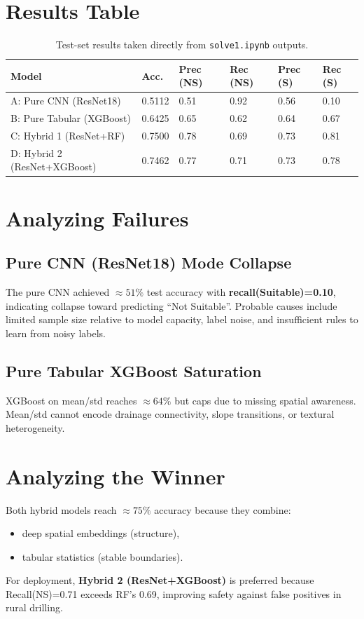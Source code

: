\documentclass[12pt,a4paper]{report}
\begin{document}
\section{Results Table}
\begin{table}[H]
\centering
\small
\begin{tabular}{p{} p{} p{} p{} p{} p{}}
\toprule
\textbf{Model} & \textbf{Acc.} &
\textbf{Prec (NS)} & \textbf{Rec (NS)} &
\textbf{Prec (S)} & \textbf{Rec (S)} \\
\midrule
A: Pure CNN (ResNet18) & 0.5112 & 0.51 & 0.92 & 0.56 & 0.10 \\
B: Pure Tabular (XGBoost) & 0.6425 & 0.65 & 0.62 & 0.64 & 0.67 \\
C: Hybrid 1 (ResNet+RF) & 0.7500 & 0.78 & 0.69 & 0.73 & 0.81 \\
D: Hybrid 2 (ResNet+XGBoost) & 0.7462 & 0.77 & 0.71 & 0.73 & 0.78 \\
\bottomrule
\end{tabular}
\caption{Test-set results taken directly from \texttt{solve1.ipynb} outputs.}
\label{tab:model2_results}
\end{table}

\section{Analyzing Failures}
\subsection{Pure CNN (ResNet18) Mode Collapse}
The pure CNN achieved \(\approx 51\%\) test accuracy with \textbf{recall(Suitable)=0.10}, indicating collapse toward predicting ``Not Suitable''. Probable causes include limited sample size relative to model capacity, label noise, and insufficient rules to learn from noisy labels.

\subsection{Pure Tabular XGBoost Saturation}
XGBoost on mean/std reaches \(\approx 64\%\) but caps due to missing spatial awareness. Mean/std cannot encode drainage connectivity, slope transitions, or textural heterogeneity.

\section{Analyzing the Winner}
Both hybrid models reach \(\approx 75\%\) accuracy because they combine:
\begin{itemize}
  \item deep spatial embeddings (structure),
  \item tabular statistics (stable boundaries).
\end{itemize}
For deployment, \textbf{Hybrid 2 (ResNet+XGBoost)} is preferred because Recall(NS)=0.71 exceeds RF’s 0.69, improving safety against false positives in rural drilling.
\end{document}
